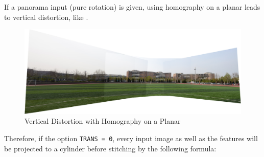 \begin{enumerate}
If a panorama input (pure rotation) is given, using homography on a planar leads to vertical distortion, like .
\begin{figure}[H]
  \centering
  \includegraphics[width=1.0\textwidth]{res/distort.png}
  \caption{Vertical Distortion with Homography on a Planar\label{fig:distort}}
\end{figure}

Therefore, if the option \verb|TRANS = 0|,
every input image as well as the features will be projected to a cylinder before stitching by the following formula:


\end{enumerate}
